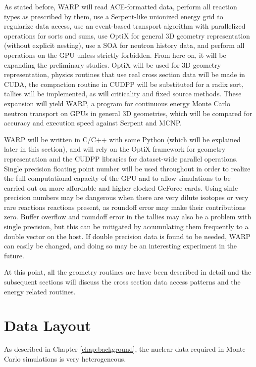 As stated before, WARP will read ACE-formatted data, perform all reaction types as prescribed by them, use a Serpent-like unionized energy grid to regularize data access, use an event-based transport algorithm with parallelized operations for sorts and sums, use OptiX for general 3D geometry representation (without explicit nesting), use a SOA for neutron history data, and perform all operations on the GPU unless strictly forbidden.  From here on, it will be expanding the preliminary studies.  OptiX will be used for 3D geometry representation, physics routines that use real cross section data will be made in CUDA, the compaction routine in CUDPP will be substituted for a radix sort, tallies will be implemented, as will criticality and fixed source methods.  These expansion will yield WARP, a program for continuous energy Monte Carlo neutron transport on GPUs in general 3D geometries, which will be compared for accuracy and execution speed against Serpent and MCNP.

WARP will be written in C/C++ with some Python (which will be explained later in this section), and will rely on the OptiX framework for geometry representation and the CUDPP libraries for dataset-wide parallel operations. Single precision floating point number will be used throughout in order to realize the full computational capacity of the GPU and to allow simulations to be carried out on more affordable and higher clocked GeForce cards.  Using sinle precision numbers may be dangerous when there are very dilute isotopes or very rare reactions reactions present, as roundoff error may make their contributions zero.  Buffer overflow and roundoff error in the tallies may also be a problem with single precision, but this can be mitigated by accumulating them frequently to a double vector on the host.  If double precision data is found to be needed, WARP can easily be changed, and doing so may be an interesting experiment in the future.

At this point, all the geometry routines are have been described in detail and the subsequent sections will discuss the cross section data access patterns and the energy related routines.


\section{Data Layout}

As described in Chapter \ref{chap:background}, the nuclear data required in Monte Carlo simulations is very heterogeneous.

